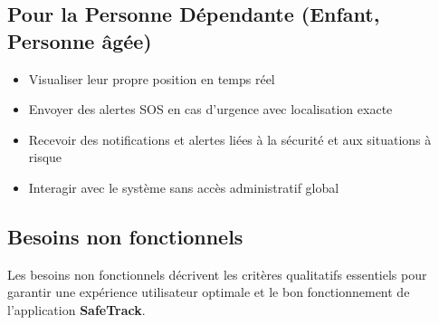 \subsection*{Pour la Personne Dépendante (Enfant, Personne âgée)}
\begin{itemize}
    \item Visualiser leur propre position en temps réel
    \item Envoyer des alertes SOS en cas d'urgence avec localisation exacte
    \item Recevoir des notifications et alertes liées à la sécurité et aux situations à risque
    \item Interagir avec le système sans accès administratif global
\end{itemize}

\subsection{Besoins non fonctionnels}

Les besoins non fonctionnels décrivent les critères qualitatifs essentiels pour garantir une expérience utilisateur optimale et le bon fonctionnement de l'application \textbf{SafeTrack}.

